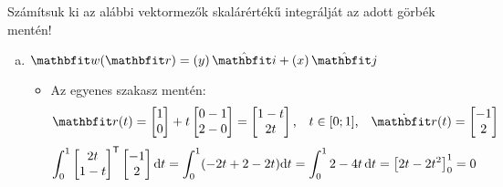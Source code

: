 \documentclass[exercise]{math-standalone}
\begin{document}
\begin{exercise}{Számítsuk ki az alábbi vektormezők skalárértékű integrálját az adott görbék mentén!}
{\begin{enumerate}[a)]
      \item $\rvec w(\rvec r) = \ijz{y}{x}$
            \begin{itemize}[i)]
              \item Az egyenes szakasz mentén:
                    \[
                      \rvec r(t) = \begin{bmatrix}
                        1 \\ 0
                      \end{bmatrix} + t \begin{bmatrix}
                        0 - 1 \\ 2 - 0
                      \end{bmatrix} = \begin{bmatrix}
                        1 - t \\ 2t
                      \end{bmatrix}
                      \text, \quad
                      t \in [0;1]
                      \text, \quad
                      \dot{\rvec r}(t) = \begin{bmatrix}
                        -1 \\ 2
                      \end{bmatrix}
                    \]
                    \[
                      \int_0^1 \begin{bmatrix}
                        2t \\ 1 - t
                      \end{bmatrix}^{\mathsf{T}}
                      \begin{bmatrix}
                        -1 \\ 2
                      \end{bmatrix}
                      \mathrm{d} t
                      = \int_0^1 (-2t + 2 - 2t) \mathrm{d} t
                      = \int_0^1 2 - 4t \, \mathrm{d} t
                      = \left[ 2t - 2t^2 \right]_0^1
                      = 0
                    \]


\end{itemize}
\end{enumerate}}
\end{exercise}
\end{document}
